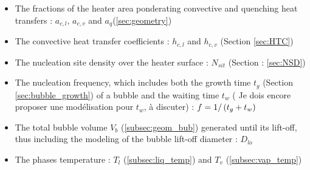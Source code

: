 \begin{itemize}
\item The fractions of the heater area ponderating convective and quenching heat transfers : $a_{c,l}$, $a_{c,v}$ and $a_{q}$(\ref{sec:geometry})
\item The convective heat transfer coefficients : $h_{c,l}$ and $h_{c,v}$ (Section \ref{sec:HTC})
\item The nucleation site density over the heater surface : $N_{sit}$ (Section : \ref{sec:NSD})
\item The nucleation frequency, which includes both the growth time $t_{g}$ (Section \ref{sec:bubble_growth}) of a bubble and the waiting time $t_{w}$ ({\color{red} Je dois encore proposer une modélisation pour $t_{w}$, à discuter}) : $f=1/\left( t_{g}+t_{w} \right)$
\item The total bubble volume $V_{b}$ (\ref{subsec:geom_bub}) generated until its lift-off, thus including the modeling of the bubble lift-off diameter : $D_{lo}$ 
\item The phases temperature : $T_{l}$ (\ref{subsec:liq_temp}) and $T_{v}$ (\ref{subsec:vap_temp})
\end{itemize}

